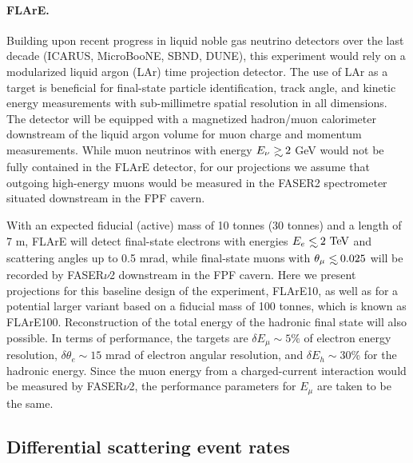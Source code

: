  \paragraph{FLArE.}
 Building upon recent progress in liquid noble gas neutrino detectors over the last decade (ICARUS, MicroBooNE, SBND, DUNE), this experiment
 would rely on a modularized liquid argon (LAr) time projection detector.
 The use of LAr as a target is beneficial for final-state particle identification, track angle, and kinetic energy measurements with sub-millimetre spatial resolution in all dimensions.
 The detector will be equipped with a magnetized hadron/muon calorimeter downstream of the liquid argon volume
 for muon charge and momentum measurements.
 While muon neutrinos with energy $E_\nu \gsim 2$ GeV would not be fully
 contained in the  FLArE detector,
for our projections
we assume that outgoing high-energy
muons would be measured in the FASER2 spectrometer
  situated downstream in the FPF cavern.
 
 With an expected fiducial (active) mass of 10 tonnes (30 tonnes) and a length of 7 m, FLArE will
 detect final-state electrons with energies $E_{e}\lsim 2~\rm{TeV}$ and
 scattering angles up to 0.5 mrad,  while final-state muons
 with $\theta_\mu \lsim 0.025$ will be recorded by FASER$\nu$2
 downstream in the FPF cavern.
 Here we present  projections for this baseline design of the experiment, FLArE10,
 as well as for a potential larger variant based on a fiducial mass of 100 tonnes, which
 is known as FLArE100.
 Reconstruction of the total energy of the hadronic final state will also
 possible. 
 In terms of performance, the targets
 are $\delta E_\mu \sim5\%$ of electron energy resolution,
 $\delta \theta_e \sim 15$ mrad of electron angular  resolution,
 and $\delta E_h \sim 30$\% for the hadronic energy.
 Since the muon energy from a charged-current interaction would be measured by FASER$\nu$2, the
 performance parameters for $E_\mu$ are taken to be the same.

\subsection{Differential scattering event rates}
\label{sec:pseudo-data_generation}

